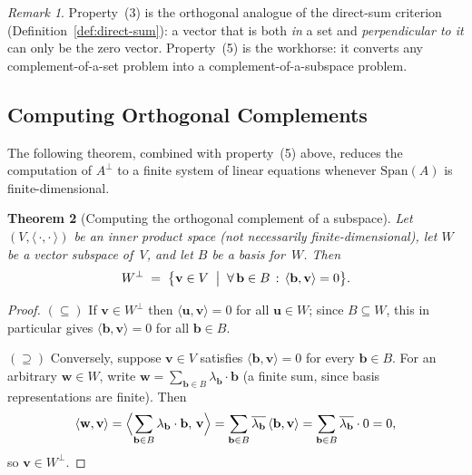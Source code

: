 \documentclass[11pt, a4paper, notitlepage]{report}
\newtheorem{theorem}{Theorem}[section]
\theoremstyle{definition}
\theoremstyle{remark}
\newtheorem{remark}[theorem]{Remark}
\begin{document}
\begin{remark}
Property~(3) is the orthogonal analogue of the direct-sum criterion
(Definition~\ref{def:direct-sum}): a vector that is both \emph{in} a set
and \emph{perpendicular to it} can only be the zero vector. Property~(5)
is the workhorse: it converts any complement-of-a-set problem into a
complement-of-a-subspace problem.
\end{remark}

\subsection{Computing Orthogonal Complements}
\label{subsec:orth-comp-procedure}

The following theorem, combined with property~(5) above, reduces
the computation of $A^\perp$ to a finite system of linear equations
whenever $\mathrm{Span}(A)$ is finite-dimensional.

\begin{theorem}[Computing the orthogonal complement of a subspace]
\label{thm:orth-comp-from-basis}
Let $(V,\langle\,\cdot,\cdot\,\rangle)$ be an inner product space (not
necessarily finite-dimensional), let $W$ be a vector subspace of~$V$, and
let $B$ be a basis for~$W$. Then
\[
  W^\perp \;=\; \bigl\{\mathbf{v}\in V \;\bigm|\;
    \forall\,\mathbf{b}\in B\,:\, \langle\mathbf{b},\mathbf{v}\rangle = 0\bigr\}.
\]
\end{theorem}

\begin{proof}
$(\subseteq)$ If $\mathbf{v}\in W^\perp$ then
$\langle\mathbf{u},\mathbf{v}\rangle = 0$ for all $\mathbf{u}\in W$;
since $B\subseteq W$, this in particular gives $\langle\mathbf{b},\mathbf{v}\rangle = 0$ for all $\mathbf{b}\in B$.

$(\supseteq)$ Conversely, suppose $\mathbf{v}\in V$ satisfies
$\langle\mathbf{b},\mathbf{v}\rangle = 0$ for every $\mathbf{b}\in B$. For an
arbitrary $\mathbf{w}\in W$, write $\mathbf{w} = \sum_{\mathbf{b}\in B}\lambda_\mathbf{b}\cdot\mathbf{b}$
(a finite sum, since basis representations are finite). Then
\[
  \langle\mathbf{w},\mathbf{v}\rangle
  = \Bigl\langle\sum_{\mathbf{b}\in B}\lambda_\mathbf{b}\cdot\mathbf{b},\,\mathbf{v}\Bigr\rangle
  = \sum_{\mathbf{b}\in B}\overline{\lambda_\mathbf{b}}\,\langle\mathbf{b},\mathbf{v}\rangle
  = \sum_{\mathbf{b}\in B}\overline{\lambda_\mathbf{b}}\cdot 0 = 0,
\]
so $\mathbf{v}\in W^\perp$.
\end{proof}
\end{document}
